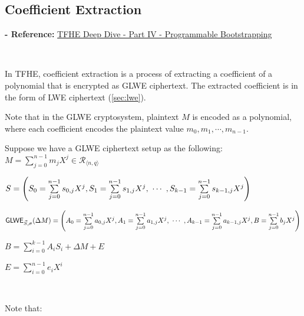 \subsection{Coefficient Extraction}
\label{subsec:tfhe-extraction}

\textbf{- Reference:} 
\href{https://www.zama.ai/post/tfhe-deep-dive-part-4}{TFHE Deep Dive - Part IV - Programmable Bootstrapping}~\cite{tfhe-4}

$ $

In TFHE, coefficient extraction is a process of extracting a coefficient of a polynomial that is encrypted as GLWE ciphertext. The extracted coefficient is in the form of LWE ciphertext (\autoref{sec:lwe}). %



Note that in the GLWE cryptosystem, plaintext $M$ is encoded as a polynomial, where each coefficient encodes the plaintext value $m_0, m_1, \cdots, m_{n-1}$.


Suppose we have a GLWE ciphertext setup as the following: \\ 
$M = \sum\limits_{j=0}^{n-1}m_jX^j \in \mathcal{R}_{\langle n, q \rangle}$ 

$S = \left(S_0 = \sum\limits_{j=0}^{n-1}s_{0,j}X^j, S_1 = \sum\limits_{j=0}^{n-1}s_{1,j}X^j, \text{ } \text{$\cdots$} \text{ }, S_{k-1} = \sum\limits_{j=0}^{n-1}s_{k-1,j}X^j \right)$ 

$\textsf{GLWE}_{\vec{S}, \sigma}(\Delta M) = \left(A_0 = \sum\limits_{j=0}^{n-1}a_{0,j}X^j, A_1 = \sum\limits_{j=0}^{n-1}a_{1,j}X^j, \text{ } \text{$\cdots$} \text{ }, A_{k-1} = \sum\limits_{j=0}^{n-1}a_{k-1,j}X^j, B = \sum\limits_{j=0}^{n-1}b_{j}X^j\right)$ 

$B = \sum\limits_{i=0}^{k-1}A_iS_i + \Delta M + E$ 

$E = \sum\limits_{i=0}^{n-1}e_iX^i$ 

$ $

\noindent Note that:

